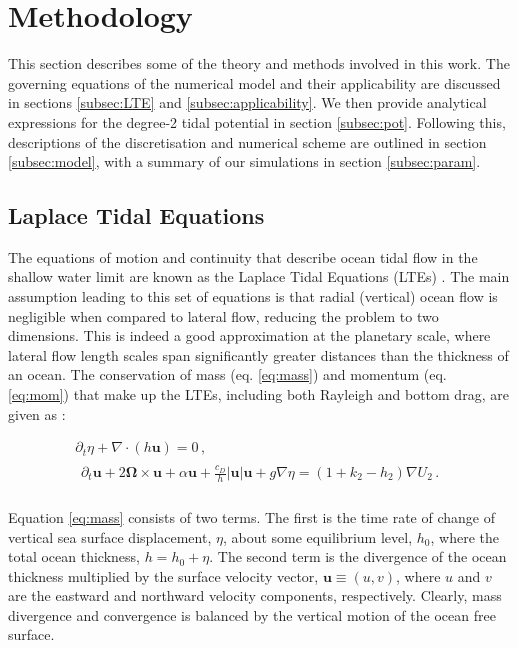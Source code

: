 \section{Methodology}\label{sec:method}

This section describes some of the theory and methods involved in this work. The governing equations of the numerical model and their applicability are discussed in sections \ref{subsec:LTE} and \ref{subsec:applicability}. We then provide analytical expressions for the degree-2 tidal potential in section \ref{subsec:pot}. Following this, descriptions of the discretisation and numerical scheme are outlined in section \ref{subsec:model}, with a summary of our simulations in section \ref{subsec:param}.

\subsection{Laplace Tidal Equations \label{subsec:LTE}}

The equations of motion and continuity that describe ocean tidal flow in the shallow water limit are known as the Laplace Tidal Equations (LTEs) \citep{lamb1932hydrodynamics}. The main assumption leading to this set of equations is that radial (vertical) ocean flow is negligible when compared to lateral flow, reducing the problem to two dimensions. This is indeed a good approximation at the planetary scale, where lateral flow length scales span significantly greater distances than the thickness of an ocean. The conservation of mass (eq. \ref{eq:mass}) and momentum (eq. \ref{eq:mom}) that make up the LTEs, including both Rayleigh and bottom drag, are given as \citep{sears1995tidal,tyler2008strong,matsuyama2014tidal}:

\vspace{-0.5cm}
\begin{gather}
\partial_t \eta + \nabla \cdot \left(h \bm{u}\right) = 0\, , \label{eq:mass}\\
\begin{aligned} 
\partial_t \bm{u} + 2 \bm{\Omega} \times \bm{u} + \alpha\bm{u} + \frac{c_D}{h} \left|\bm{u}\right| \bm{u}  + g \nabla \eta = (1 + k_2 - h_2) \nabla U_2 \, . \label{eq:mom}\\
\end{aligned} 
\end{gather}

Equation \ref{eq:mass} consists of two terms. The first is the time rate of change of vertical sea surface displacement, $\eta$, about some equilibrium level, $h_0$, where the total ocean thickness, $h = h_0 + \eta$. The second term is the divergence of the ocean thickness multiplied by the surface velocity vector, $\bm{u} \equiv (u, v)$, where $u$ and $v$ are the eastward and northward velocity components, respectively. Clearly, mass divergence and convergence is balanced by the vertical motion of the ocean free surface.

